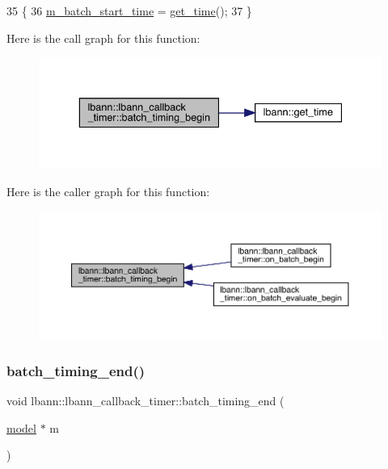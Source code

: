 \begin{DoxyCode}
35                                                       \{
36   \hyperlink{classlbann_1_1lbann__callback__timer_a56a597dea5c6649442311dc15ee6d06f}{m\_batch\_start\_time} = \hyperlink{namespacelbann_a478d36031ff0659893c4322cd856157f}{get\_time}();
37 \}
\end{DoxyCode}
Here is the call graph for this function\+:\nopagebreak
\begin{figure}[H]
\begin{center}
\leavevmode
\includegraphics[width=336pt]{classlbann_1_1lbann__callback__timer_a6a8a59707a52b8b570b7605b90fdd159_cgraph}
\end{center}
\end{figure}
Here is the caller graph for this function\+:\nopagebreak
\begin{figure}[H]
\begin{center}
\leavevmode
\includegraphics[width=350pt]{classlbann_1_1lbann__callback__timer_a6a8a59707a52b8b570b7605b90fdd159_icgraph}
\end{center}
\end{figure}
\mbox{\label{classlbann_1_1lbann__callback__timer_afbf58bd4e1b4c1bcae2e50f78c9507f0}} 
\subsubsection{\texorpdfstring{batch\+\_\+timing\+\_\+end()}{batch\_timing\_end()}}
{\footnotesize\ttfamily void lbann\+::lbann\+\_\+callback\+\_\+timer\+::batch\+\_\+timing\+\_\+end (\begin{DoxyParamCaption}\item[{\hyperlink{classlbann_1_1model}{model} $\ast$}]{m }\end{DoxyParamCaption})\hspace{0.3cm}{\ttfamily [private]}}

